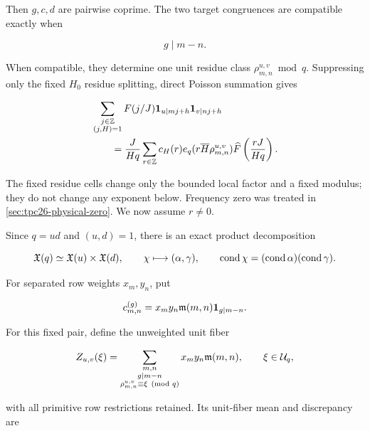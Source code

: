 Then \(g,c,d\) are pairwise coprime.  The two target congruences are
compatible exactly when

\begin{equation}
 g\mid m-n.
 \label{eq:tpc26-compatibility}
\end{equation}

When compatible, they determine one unit residue class
\(\rho_{m,n}^{u,v}\bmod q\).  Suppressing only the fixed \(H_0\)
residue splitting, direct Poisson summation gives

\begin{align}
 &\sum_{\substack{j\in\mathbb Z\\(j,H)=1}}
 F(j/J)
 \mathbf 1_{u\mid mj+h}\mathbf 1_{v\mid nj+h}
 \notag\\
 &\qquad=
 \frac{J}{Hq}\sum_{r\in\mathbb Z}c_H(r)
 e_q(r\overline H\rho_{m,n}^{u,v})
 \widehat F\left(\frac{rJ}{Hq}\right).
 \label{eq:tpc26-raw-joint-poisson}
\end{align}

The fixed residue cells change only the bounded local factor and a
fixed modulus; they do not change any exponent below.  Frequency zero
was treated in \cref{sec:tpc26-physical-zero}.  We now assume \(r\ne0\).

Since \(q=ud\) and \((u,d)=1\), there is an exact product
decomposition

\begin{equation}
 \mathfrak X(q)\simeq\mathfrak X(u)\times\mathfrak X(d),
 \qquad \chi\longmapsto(\alpha,\gamma),
 \qquad
 \operatorname{cond}\chi=(\operatorname{cond}\alpha)(\operatorname{cond}\gamma).
 \label{eq:tpc26-product-characters}
\end{equation}

For separated row weights \(x_m,y_n\), put

\begin{equation}
 c_{m,n}^{(g)}
 =x_my_n\mathfrak m(m,n)\mathbf 1_{g\mid m-n}.
 \label{eq:tpc26-compatibility-matrix}
\end{equation}

For this fixed pair, define the unweighted unit fiber

\begin{equation}
 Z_{u,v}(\xi)
 =\sum_{\substack{m,n\\g\mid m-n\\
                   \rho_{m,n}^{u,v}\equiv\xi\pmod q}}
 x_my_n\mathfrak m(m,n),
 \qquad \xi\in\mathcal U_q,
 \label{eq:tpc26-pair-unit-fiber}
\end{equation}

with all primitive row restrictions retained.  Its unit-fiber mean and
discrepancy are

